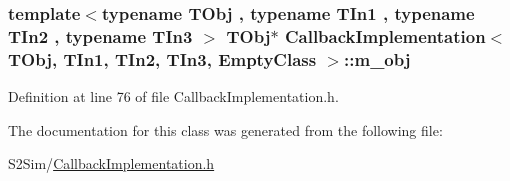 \hypertarget{class_callback_implementation_3_01_t_obj_00_01_t_in1_00_01_t_in2_00_01_t_in3_00_01_empty_class_01_4_accf9a294d8f7328f567951c4acade13b}{
\subsubsection[{m\-\_\-obj}]{\setlength{\rightskip}{0pt plus 5cm}template$<$typename T\-Obj , typename T\-In1 , typename T\-In2 , typename T\-In3 $>$ T\-Obj$\ast$ {\bf Callback\-Implementation}$<$ T\-Obj, T\-In1, T\-In2, T\-In3, {\bf Empty\-Class} $>$\-::m\-\_\-obj\hspace{0.3cm}{\ttfamily [private]}}}\label{class_callback_implementation_3_01_t_obj_00_01_t_in1_00_01_t_in2_00_01_t_in3_00_01_empty_class_01_4_accf9a294d8f7328f567951c4acade13b}


Definition at line 76 of file Callback\-Implementation.\-h.



The documentation for this class was generated from the following file\-:\begin{DoxyCompactItemize}
\item 
S2\-Sim/\hyperlink{_callback_implementation_8h}{Callback\-Implementation.\-h}\end{DoxyCompactItemize}
